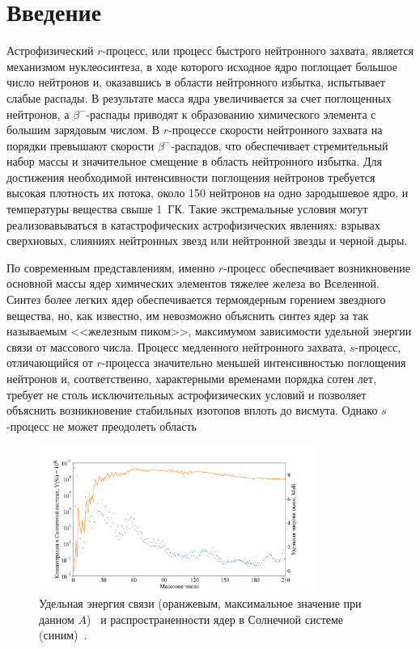 \section*{Введение}

Астрофизический $r$-процесс, или процесс быстрого нейтронного захвата, является механизмом нуклеосинтеза, в ходе которого исходное ядро поглощает большое число нейтронов и, оказавшись в области нейтронного избытка, испытывает слабые распады. В результате масса ядра увеличивается за счет поглощенных нейтронов, а $\beta^-$-распады приводят к образованию химического элемента с большим зарядовым числом. В $r$-процессе скорости нейтронного захвата на порядки превышают скорости $\beta^-$-распадов, что обеспечивает стремительный набор массы и значительное смещение в область нейтронного избытка. Для достижения необходимой интенсивности поглощения нейтронов требуется высокая плотность их потока, около 150 нейтронов на одно зародышевое ядро, и температуры вещества свыше 1~ГК. Такие экстремальные условия могут реализовавываться в катастрофических астрофизических явлениях: взрывах сверхновых, слияниях нейтронных звезд или нейтронной звезды и черной дыры. 

По современным представлениям, именно $r$-процесс обеспечивает возникновение основной массы ядер химических элементов тяжелее железа во Вселенной. Синтез более легких ядер обеспечивается термоядерным горением звездного вещества, но, как известно, им невозможно объяснить синтез ядер за так называемым <<железным пиком>>, максимумом зависимости удельной энергии связи от массового числа. Процесс медленного нейтронного захвата, $s$-процесс, отличающийся от $r$-процесса значительно меньшей интенсивностью поглощения нейтронов и, соответственно, характерными временами порядка сотен лет, требует не столь исключительных астрофизических условий и позволяет объяснить возникновение стабильных изотопов вплоть до висмута. Однако $s$-процесс не может преодолеть область

\begin{figure}
  \centering
  \includegraphics[width=0.8\textwidth]{pics/lodders_vs_ame.pdf}
  \caption{Удельная энергия связи (оранжевым, максимальное значение при данном $A$)~\cite{huang2021} и распространенности ядер в Солнечной системе (синим)~\cite{lodders2003}.}
  \label{img:lodders_vs_ame}
\end{figure}




